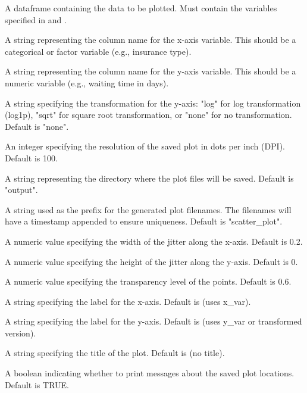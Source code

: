 \documentclass[a4paper]{book}
\begin{document}
%
\begin{Arguments}
\begin{ldescription}
\item[\code{data}] A dataframe containing the data to be plotted. Must contain the variables specified in  and .

\item[\code{x\_var}] A string representing the column name for the x-axis variable. This should be a categorical or factor variable (e.g., insurance type).

\item[\code{y\_var}] A string representing the column name for the y-axis variable. This should be a numeric variable (e.g., waiting time in days).

\item[\code{y\_transform}] A string specifying the transformation for the y-axis: "log" for log transformation (log1p), "sqrt" for square root transformation, or "none" for no transformation. Default is "none".

\item[\code{dpi}] An integer specifying the resolution of the saved plot in dots per inch (DPI). Default is 100.

\item[\code{output\_dir}] A string representing the directory where the plot files will be saved. Default is "output".

\item[\code{file\_prefix}] A string used as the prefix for the generated plot filenames. The filenames will have a timestamp appended to ensure uniqueness. Default is "scatter\_plot".

\item[\code{jitter\_width}] A numeric value specifying the width of the jitter along the x-axis. Default is 0.2.

\item[\code{jitter\_height}] A numeric value specifying the height of the jitter along the y-axis. Default is 0.

\item[\code{point\_alpha}] A numeric value specifying the transparency level of the points. Default is 0.6.

\item[\code{x\_label}] A string specifying the label for the x-axis. Default is  (uses x\_var).

\item[\code{y\_label}] A string specifying the label for the y-axis. Default is  (uses y\_var or transformed version).

\item[\code{plot\_title}] A string specifying the title of the plot. Default is  (no title).

\item[\code{verbose}] A boolean indicating whether to print messages about the saved plot locations. Default is TRUE.
\end{ldescription}
\end{Arguments}
\end{document}

